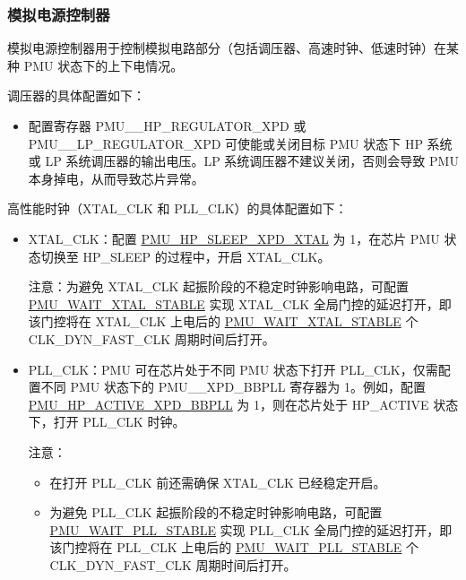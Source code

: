\documentclass[main\_\_CN.tex]{subfiles}
\begin{document}
\subsubsection{模拟电源控制器}\label{sec:pmu_analog_power_controller}

模拟电源控制器用于控制模拟电路部分（包括调压器、高速时钟、低速时钟）在某种 PMU 状态下的上下电情况。

调压器的具体配置如下：

\begin{itemize}
    \item 配置寄存器 PMU\_\_HP\_REGULATOR\_XPD 或PMU\_\_LP\_REGULATOR\_XPD 可使能或关闭目标 PMU 状态下 HP 系统或 LP 系统调压器的输出电压。LP 系统调压器不建议关闭，否则会导致 PMU 本身掉电，从而导致芯片异常。
\end{itemize}

高性能时钟（XTAL\_CLK 和 PLL\_CLK）的具体配置如下：

\begin{itemize}
    \item XTAL\_CLK：配置 \hyperref[fielddesc:PMUHPSLEEPXPDXTAL]{PMU\_HP\_SLEEP\_XPD\_XTAL} 为 1，在芯片 PMU 状态切换至 HP\_SLEEP 的过程中，开启 XTAL\_CLK。

    注意：为避免 XTAL\_CLK 起振阶段的不稳定时钟影响电路，可配置 \hyperref[fielddesc:PMUWAITXTALSTABLE]{PMU\_WAIT\_XTAL\_STABLE} 实现 XTAL\_CLK 全局门控的延迟打开，即该门控将在 XTAL\_CLK 上电后的 \hyperref[fielddesc:PMUWAITXTALSTABLE]{PMU\_WAIT\_XTAL\_STABLE} 个 CLK\_DYN\_FAST\_CLK 周期时间后打开。

    \item PLL\_CLK：PMU 可在芯片处于不同 PMU 状态下打开 PLL\_CLK，仅需配置不同 PMU 状态下的 PMU\_\_XPD\_BBPLL 寄存器为 1。例如，配置 \hyperref[fielddesc:PMUHPACTIVEXPDBBPLL]{PMU\_HP\_ACTIVE\_XPD\_BBPLL} 为 1，则在芯片处于 HP\_ACTIVE 状态下，打开 PLL\_CLK 时钟。

    注意：
    \begin{itemize}
        \item 在打开 PLL\_CLK 前还需确保 XTAL\_CLK 已经稳定开启。
        \item 为避免 PLL\_CLK 起振阶段的不稳定时钟影响电路，可配置 \hyperref[fielddesc:PMUWAITPLLSTABLE]{PMU\_WAIT\_PLL\_STABLE} 实现 PLL\_CLK 全局门控的延迟打开，即该门控将在 PLL\_CLK 上电后的 \hyperref[fielddesc:PMUWAITPLLSTABLE]{PMU\_WAIT\_PLL\_STABLE} 个CLK\_DYN\_FAST\_CLK 周期时间后打开。
    \end{itemize}
\end{itemize}
\end{document}
